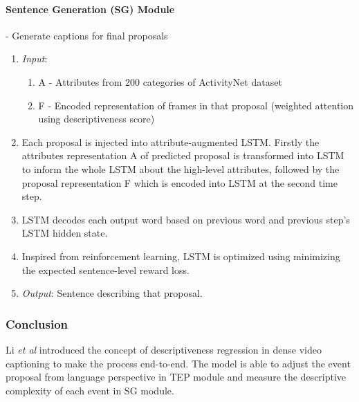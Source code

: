 \paragraph{Sentence Generation (SG) Module} - Generate captions for final proposals
\begin{enumerate}
	\item \textit{Input}:
	\begin{enumerate}
		\item A - Attributes from 200 categories of ActivityNet dataset
		\item F - Encoded representation of frames in that proposal (weighted attention using descriptiveness score)
	\end{enumerate}
	\item Each proposal is injected into attribute-augmented LSTM. Firstly the attributes representation A of predicted proposal is transformed into LSTM to inform the whole LSTM about the high-level attributes, followed by the proposal representation F which is encoded into LSTM at the second time step.
	\item LSTM decodes each output word based on previous word and previous step’s LSTM hidden state.
	\item Inspired from reinforcement learning, LSTM is optimized using minimizing the expected sentence-level reward loss.
	\item \textit{Output}: Sentence describing that proposal.
\end{enumerate}


\subsubsection{Conclusion}

\par Li \textit{et al} introduced the concept of descriptiveness regression in dense video captioning to make the process end-to-end. The model is able to adjust the
event proposal from language perspective in TEP module and measure the descriptive complexity of each event in SG module.